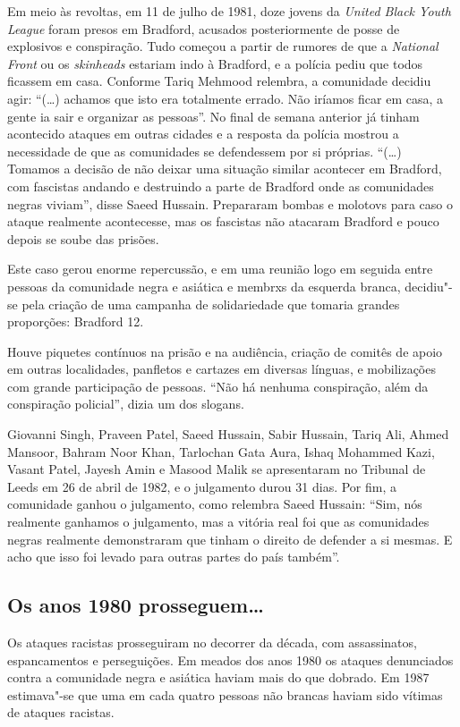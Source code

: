 Em meio às revoltas, em 11 de julho de 1981, doze jovens da \emph{United Black Youth League} foram presos em Bradford, acusados posteriormente de posse de explosivos e conspiração. Tudo começou a partir de rumores de que a \emph{National Front} ou os \emph{skinheads} estariam indo à Bradford, e a polícia pediu que todos ficassem em casa. Conforme Tariq Mehmood relembra, a comunidade decidiu agir: ``(\ldots{}) achamos que isto era totalmente errado. Não iríamos ficar em casa, a gente ia sair e organizar as pessoas''. No final de semana anterior já tinham acontecido ataques em outras cidades e a resposta da polícia mostrou a necessidade de que as comunidades se defendessem por si próprias. ``(\ldots{}) Tomamos a decisão de não deixar uma situação similar acontecer em Bradford, com fascistas andando e destruindo a parte de Bradford onde as comunidades negras viviam'', disse Saeed Hussain. Prepararam bombas e molotovs para caso o ataque realmente acontecesse, mas os fascistas não atacaram Bradford e pouco depois se soube das prisões.

Este caso gerou enorme repercussão, e em uma reunião logo em seguida entre pessoas da comunidade negra e asiática e membrxs da esquerda branca, decidiu"-se pela criação de uma campanha de solidariedade que tomaria grandes proporções: Bradford 12.

Houve piquetes contínuos na prisão e na audiência, criação de comitês de apoio em outras localidades, panfletos e cartazes em diversas línguas, e mobilizações com grande participação de pessoas. ``Não há nenhuma conspiração, além da conspiração policial'', dizia um dos slogans.

Giovanni Singh, Praveen Patel, Saeed Hussain, Sabir Hussain, Tariq Ali, Ahmed Mansoor, Bahram Noor Khan, Tarlochan Gata Aura, Ishaq Mohammed Kazi, Vasant Patel, Jayesh Amin e Masood Malik se apresentaram no Tribunal de Leeds em 26 de abril de 1982, e o julgamento durou 31 dias. Por fim, a comunidade ganhou o julgamento, como relembra Saeed Hussain: ``Sim, nós realmente ganhamos o julgamento, mas a vitória real foi que as comunidades negras realmente demonstraram que tinham o direito de defender a si mesmas. E acho que isso foi levado para outras partes do país também''.


\subsection{Os anos 1980 prosseguem\ldots{}}

Os ataques racistas prosseguiram no decorrer da década, com assassinatos, espancamentos e perseguições. Em meados dos anos 1980 os ataques denunciados contra a comunidade negra e asiática haviam mais do que dobrado. Em 1987 estimava"-se que uma em cada quatro pessoas não brancas haviam sido vítimas de ataques racistas.

